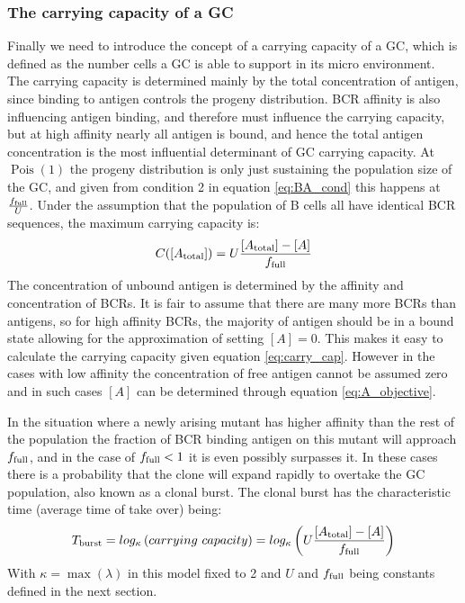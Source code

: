 \subsubsection{The carrying capacity of a GC}
Finally we need to introduce the concept of a carrying capacity of a GC, which is defined as the number cells a GC is able to support in its micro environment.
The carrying capacity is determined mainly by the total concentration of antigen, since binding to antigen controls the progeny distribution.
BCR affinity is also influencing antigen binding, and therefore must influence the carrying capacity, but at high affinity nearly all antigen is bound, and hence the total antigen concentration is the most influential determinant of GC carrying capacity.
At $\operatorname{Pois}(1)$ the progeny distribution is only just sustaining the population size of the GC, and given from condition 2 in equation \ref{eq:BA_cond} this happens at $\frac{f_{\text{full}}}{U}$.
Under the assumption that the population of B cells all have identical BCR sequences, the maximum carrying capacity is:
\begin{equation}
C([A_{\text{total}}]) = U \frac{[A_{\text{total}}] - [A]}{f_{\text{full}}}
  \label{eq:carry_cap}
\end{equation}
The concentration of unbound antigen is determined by the affinity and concentration of BCRs.
It is fair to assume that there are many more BCRs than antigens, so for high affinity BCRs, the majority of antigen should be in a bound state allowing for the approximation of setting $[A]=0$.
This makes it easy to calculate the carrying capacity given equation \ref{eq:carry_cap}.
However in the cases with low affinity the concentration of free antigen cannot be assumed zero and in such cases $[A]$ can be determined through equation \ref{eq:A_objective}.

In the situation where a newly arising mutant has higher affinity than the rest of the population the fraction of BCR binding antigen on this mutant will approach $f_{\text{full}}$, and in the case of $f_{\text{full}} < 1$ it is even possibly surpasses it.
In these cases there is a probability that the clone will expand rapidly to overtake the GC population, also known as a clonal burst.
The clonal burst has the characteristic time (average time of take over) being:
$$
T_{\text{burst}} = log_\kappa \left(carrying\ capacity \right) = log_\kappa\left( U \frac{[A_{\text{total}}] - [A]}{f_{\text{full}}} \right)
$$
With $\kappa = \operatorname{max}(\lambda)$ in this model fixed to 2 and $U$ and $f_{\text{full}}$ being constants defined in the next section.






